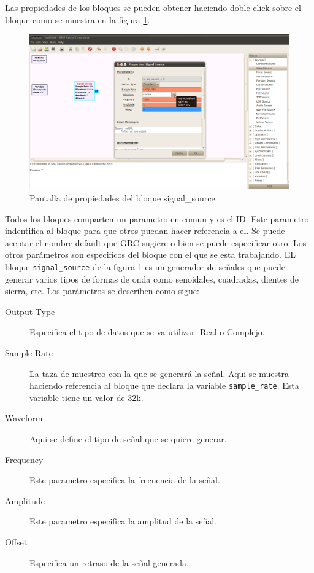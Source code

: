 Las propiedades de los bloques se pueden obtener haciendo doble click sobre el bloque como se
muestra en la figura \ref{fig:blockprop}.

\begin{figure}[tp]
  \centering
  \includegraphics[width=5.5in]{figs/grc3}
  \vspace{0.1in}
  \caption{Pantalla de propiedades del bloque signal\_source}
  \label{fig:blockprop}
\end{figure}

Todos los bloques comparten un parametro en comun y es el ID. Este parametro indentifica al bloque
para que otros puedan hacer referencia a el. Se puede aceptar el nombre default que GRC sugiere o
bien se puede especificar otro. Los otros par\'ametros son especificos del bloque con el que se esta
trabajando. EL bloque \verb|signal_source| de la figura \ref{fig:blockprop} es un generador de
se\~nales que puede generar varios tipos de formas de onda como senoidales, cuadradas, dientes de
sierra, etc. Los par\'ametros se describen como sigue:

\begin{description}
\item[Output Type] Especifica el tipo de datos que se va utilizar: Real o Complejo.
\item[Sample Rate] La taza de muestreo con la que se generar\'a la se\~nal. Aqui se muestra haciendo
referencia al bloque que declara la variable \verb|sample_rate|. Esta variable tiene un valor de
32k.
\item[Waveform] Aqui se define el tipo de se\~nal que se quiere generar.
\item[Frequency] Este parametro especifica la frecuencia de la se\~nal.
\item[Amplitude] Este parametro especifica la amplitud de la se\~nal.
\item[Offset] Especifica un retraso de la se\~nal generada.
\end{description}

